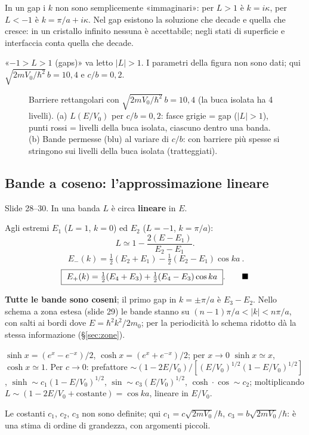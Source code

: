 \documentclass[11pt,a4paper]{article}
\begin{document}
\begin{osservazione}
In un gap i $k$ non sono semplicemente «immaginari»: per $L>1$ è $k=i\kappa$, per $L<-1$ è $k=\pi/a+i\kappa$. Nel gap esistono la soluzione che decade e
quella che cresce: in un cristallo infinito nessuna è accettabile; negli stati di superficie e interfaccia conta quella che decade.
\end{osservazione}
\begin{osservazione}
«$-1>L>1$ (gaps)» va letto $|L|>1$. I parametri della figura non sono dati; qui $\sqrt{2mV_0/\hbar^2}\,b=10{,}4$ e $c/b=0{,}2$.
\end{osservazione}

\begin{figure}[tbp]
\centering
{}
\caption{Barriere rettangolari con $\sqrt{2mV_0/\hbar^2}\,b=10{,}4$ (la buca isolata ha 4 livelli). (a) $L(E/V_0)$ per $c/b=0{,}2$: fasce grigie = gap ($|L|>1$), punti rossi = livelli della buca
isolata, ciascuno dentro una banda. (b) Bande permesse (blu) al variare di $c/b$: con barriere più spesse si stringono sui livelli della buca isolata (tratteggiati).}\label{fig:kpev}
\end{figure}

\subsection{Bande a coseno: l'approssimazione lineare}\label{sec:coseno}
Slide 28--30. In una banda $L$ è circa \textbf{lineare} in $E$.
\begin{dimostrazione}
Agli estremi $E_1$ ($L=1$, $k=0$) ed $E_2$ ($L=-1$, $k=\pi/a$):
\[
L\simeq1-\frac{2(E-E_1)}{E_2-E_1}.
\]
\[
\boxed{\ E_-(k)=\tfrac12(E_2+E_1)-\tfrac12(E_2-E_1)\cos ka\ }.
\]
\[
\boxed{\ E_+(k)=\tfrac12(E_4+E_3)+\tfrac12(E_4-E_3)\cos ka\ }.\qed
\]
\end{dimostrazione}
\textbf{Tutte le bande sono coseni}; il primo gap in $k=\pm\pi/a$ è $E_3-E_2$. Nello schema a zona estesa (slide 29) le bande stanno su $(n-1)\pi/a<|k|<n\pi/a$, con salti ai bordi
dove $E=\hbar^2k^2/2m_0$; per la periodicità lo schema ridotto dà la stessa informazione (§\ref{sec:zone}).

\begin{approfondimento}
$\sinh x=(e^x-e^{-x})/2$, $\cosh x=(e^x+e^{-x})/2$; per $x\to0$ $\sinh x\simeq x$, $\cosh x\simeq1$. Per $c\to0$: prefattore
$\sim(1-2E/V_0)/[(E/V_0)^{1/2}(1-E/V_0)^{1/2}]$, $\sinh\sim c_1(1-E/V_0)^{1/2}$, $\sin\sim c_3(E/V_0)^{1/2}$, $\cosh\cdot\cos\sim c_2$; moltiplicando
$L\sim(1-2E/V_0+\text{costante})=\cos ka$, lineare in $E/V_0$.
\end{approfondimento}
\begin{osservazione}
Le costanti $c_1$, $c_2$, $c_3$ non sono definite; qui $c_1=c\sqrt{2mV_0}/\hbar$, $c_3=b\sqrt{2mV_0}/\hbar$: è una stima di ordine di grandezza, con argomenti piccoli.
\end{osservazione}
\end{document}
